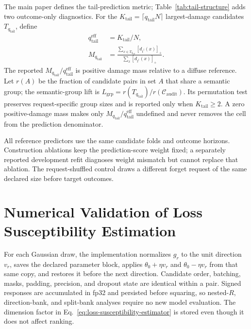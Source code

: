The main paper defines the tail-prediction metric; Table~\ref{tab:tail-structure}
adds two outcome-only diagnostics. For the
$K_{\mathrm{tail}}=\lceil q_{\mathrm{tail}}N\rceil$ largest-damage candidates
$T_{q_{\mathrm{tail}}}$, define
\begin{equation}
\begin{aligned}
q_{\mathrm{tail}}^{\mathrm{eff}}&=K_{\mathrm{tail}}/N,\\
M_{q_{\mathrm{tail}}}&=
\frac{\sum_{x\in T_{q_{\mathrm{tail}}}}[d_{t^\dagger}(x)]_+}
{\sum_x[d_{t^\dagger}(x)]_+}.
\end{aligned}
\end{equation}
The reported
$M_{q_{\mathrm{tail}}}/q_{\mathrm{tail}}^{\mathrm{eff}}$ is positive
damage mass relative to a diffuse reference. Let $r(A)$ be the fraction of
candidate pairs in set $A$ that share a semantic group; the semantic-group
lift is $L_{\mathrm{grp}}=r(T_{q_{\mathrm{tail}}})/
r(\mathcal C_{\mathrm{audit}})$. Its
permutation test preserves request-specific group sizes and is reported only
when $K_{\mathrm{tail}}\geq 2$. A zero positive-damage
mass makes only $M_{q_{\mathrm{tail}}}/q_{\mathrm{tail}}^{\mathrm{eff}}$
undefined and never removes the cell from the prediction
denominator.



All reference predictors use the same candidate folds and outcome horizons.
Construction ablations keep the prediction-score weight fixed; a separately
reported development refit diagnoses weight mismatch but cannot replace that
ablation. The request-shuffled control draws a different forget request of the
same declared size before target outcomes.

\FloatBarrier

\section{Numerical Validation of Loss Susceptibility Estimation}
\label{app:estimator-stability}
\label{app:probe-details}
\label{app:randomized-impl}

For each Gaussian draw, the implementation normalizes $g_r$ to the unit
direction $v_r$, saves the declared parameter block, applies
$\theta_0+\eta v_r$ and $\theta_0-\eta v_r$ from that same copy, and restores
it before the next direction. Candidate order,
batching, masks, padding, precision, and dropout state are identical within a
pair. Signed responses are accumulated in fp32 and persisted before squaring,
so nested-$R$, direction-bank, and split-bank analyses require no new model
evaluation. The dimension factor in Eq.~\eqref{eq:loss-susceptibility-estimator} is
stored even though it does not affect ranking.

